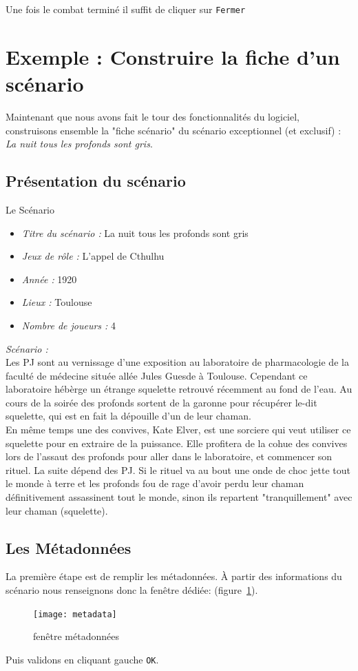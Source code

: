 \documentclass[a4paper,12pt]{article}
\newcommand*{\interfaceitem}[1]{\texttt{#1}}
\begin{document}
Une fois le combat terminé il suffit de cliquer sur \interfaceitem{Fermer}

\section{Exemple : Construire la fiche d'un scénario}

Maintenant que nous avons fait le tour des fonctionnalités du logiciel, construisons ensemble la "fiche scénario" du scénario exceptionnel (et exclusif) : \emph{La nuit tous les profonds sont gris}.

\subsection{Présentation du scénario}
\label{exemple_scenario}
Le Scénario
\begin{itemize}
    \item \emph{Titre du scénario :} La nuit tous les profonds sont gris
    \item \emph{Jeux de rôle :} L'appel de Cthulhu
    \item \emph{Année :} 1920
    \item \emph{Lieux :} Toulouse
    \item \emph{Nombre de joueurs : } 4
\end{itemize}

\emph{Scénario :}\\ 
Les PJ sont au vernissage d'une exposition au laboratoire de pharmacologie de la faculté de médecine située allée Jules Guesde à Toulouse. Cependant ce laboratoire hébèrge  un étrange squelette retrouvé récemment au fond de l'eau. Au cours de la soirée des profonds sortent de la garonne pour récupérer le-dit squelette, qui est en fait la dépouille d'un de leur chaman.
\\
En même temps une des convives, Kate Elver, est une sorciere qui veut utiliser ce squelette pour en extraire de la puissance. Elle profitera de la cohue des convives lors de l'assaut des profonds pour aller dans le laboratoire, et commencer son rituel. La suite dépend des PJ. Si le rituel va au bout une onde de choc jette tout le monde à terre et les profonds fou de rage d'avoir perdu leur chaman définitivement assassinent tout le monde, sinon ils repartent "tranquillement" avec leur chaman (squelette).

\subsection{Les Métadonnées}
La première étape est de remplir les métadonnées. À partir des informations du scénario nous renseignons donc la fenêtre dédiée: (figure~\ref{metadata}).
\begin{figure}[h!]
    \texttt{[image: metadata]}
    \caption{fenêtre métadonnées}
    \label{metadata}
\end{figure}
Puis validons en cliquant gauche \interfaceitem{OK}.
\end{document}
